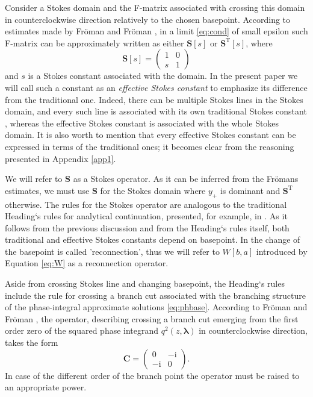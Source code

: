 \documentclass[atmp]{ipart_v1}
\def\rmi{\mathrm{i}}
\def\lmbd{\bm{\lambda}}
\def\S{\bm{S}}
\def\C{\bm{C}}
\def\T{\mathrm{T}}
\newcommand\eref[1]{\eqref{#1}}
\newcommand\Eref[1]{Equation \ref{#1}}
\newcommand\Aref[1]{Appendix \ref{#1}}
\begin{document}
Consider a Stokes domain and the F-matrix associated with crossing this domain in 
counterclockwise direction relatively to the chosen basepoint. According to estimates 
made by Fr\"oman and Fr\"oman \cite{frbook}, in a limit \eref{eq:cond} of small epsilon 
such F-matrix can be approximately written as either $\S[s]$ or $\S^{\T}[s]$, where
\begin{equation}
\S[s] = \left(\begin{array}{*{2}{c}} 1 & 0 \\ s & 1 \end{array}\right)    
\end{equation}
and $s$ is a Stokes constant associated with the domain. 
In the present paper we will call such a constant as an \emph{effective Stokes constant} 
to emphasize its difference from the traditional one. Indeed, there can be multiple Stokes 
lines in the Stokes domain, and every such line is associated with its own traditional Stokes 
constant \cite{heading, rwbook}, whereas the effective Stokes constant is associated with 
the whole Stokes domain. It is also worth to mention that every effective Stokes constant can be 
expressed in terms of the traditional ones; it becomes clear from the reasoning presented in \Aref{app1}.

We will refer to $\S$ as a Stokes operator. As it can be inferred from the Fr\"omans estimates,
we must use $\S$ for the Stokes domain where $y_+$ is dominant and $\S^{\T}$ otherwise. The rules
for the Stokes operator are analogous to the traditional Heading`s rules for analytical 
continuation, presented, for example, in \cite{heading, rwbook}. As it follows from the previous discussion
and from the Heading`s rules itself, both traditional and effective Stokes constants depend on basepoint.
In \cite{heading, rwbook} the change of the basepoint is called 'reconnection', thus we will
refer to $W[b,a]$ introduced by \Eref{eq:W} as a reconnection operator.

Aside from crossing Stokes line and changing basepoint, the Heading`s rules include the rule for crossing a 
branch cut associated with the branching structure of the phase-integral approximate solutions \eref{eq:phbase}.
According to Fr\"oman and Fr\"oman \cite{frbook}, the operator, describing crossing a branch cut emerging 
from the first order zero of the squared phase integrand $q^2(z,\lmbd)$ in counterclockwise direction, takes the form
\begin{equation}
\C =  \left(\begin{array}{*{2}{c}} 0 & -\rmi \\ -\rmi & 0 \end{array}\right).    
\label{eq:C}
\end{equation}
In case of the different order of the branch point the operator must be raised to an appropriate power.
\end{document}
